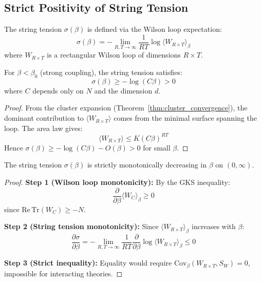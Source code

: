 \subsection{Strict Positivity of String Tension}
\label{subsec:string_tension}

\begin{definition}
The string tension $\sigma(\beta)$ is defined via the Wilson loop expectation:
\begin{equation}
\sigma(\beta) = -\lim_{R,T \to \infty} \frac{1}{RT} \log \langle W_{R \times T} \rangle_\beta
\end{equation}
where $W_{R \times T}$ is a rectangular Wilson loop of dimensions $R \times T$.
\end{definition}

\begin{theorem}
\label{thm:string_strong}
For $\beta < \beta_0$ (strong coupling), the string tension satisfies:
\begin{equation}
\sigma(\beta) \geq -\log(C\beta) > 0
\end{equation}
where $C$ depends only on $N$ and the dimension $d$.
\end{theorem}

\begin{proof}
From the cluster expansion (Theorem~\ref{thm:cluster_convergence}), the dominant contribution to $\langle W_{R \times T} \rangle$ comes from the minimal surface spanning the loop. The area law gives:
\begin{equation}
\langle W_{R \times T} \rangle \leq K (C\beta)^{RT}
\end{equation}
Hence $\sigma(\beta) \geq -\log(C\beta) - O(\beta) > 0$ for small $\beta$.
\end{proof}

\begin{theorem}
\label{thm:rp_monotonicity}
The string tension $\sigma(\beta)$ is strictly monotonically decreasing in $\beta$ on $(0, \infty)$.
\end{theorem}

\begin{proof}
\textbf{Step 1 (Wilson loop monotonicity):}
By the GKS inequality:
\begin{equation}
\frac{\partial}{\partial \beta} \langle W_C \rangle_\beta \geq 0
\end{equation}
since $\mathrm{Re}\,\mathrm{Tr}(W_C) \geq -N$.

\textbf{Step 2 (String tension monotonicity):}
Since $\langle W_{R \times T} \rangle_\beta$ increases with $\beta$:
\begin{equation}
\frac{\partial \sigma}{\partial \beta} = -\lim_{R,T \to \infty} \frac{1}{RT} \frac{\partial}{\partial \beta} \log \langle W_{R \times T} \rangle_\beta \leq 0
\end{equation}

\textbf{Step 3 (Strict inequality):}
Equality would require $\mathrm{Cov}_\beta(W_{R \times T}, S_W) = 0$, impossible for interacting theories.
\end{proof}

